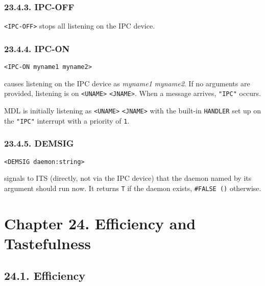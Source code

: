 \documentclass[a4paper,]{article}
\begin{document}
\subsubsection{23.4.3. IPC-OFF}\label{ipc-off}

\texttt{\textless{}IPC-OFF\textgreater{}} stops all listening on the IPC device.

\subsubsection{23.4.4. IPC-ON}\label{ipc-on}

\begin{verbatim}
<IPC-ON myname1 myname2>
\end{verbatim}

 causes listening on the IPC device as \emph{myname1} \emph{myname2}. If no arguments are
provided, listening is on \texttt{\textless{}UNAME\textgreater{}} \texttt{\textless{}JNAME\textgreater{}}. When a message
arrives, \texttt{"IPC"} occurs.

MDL is initially listening as \texttt{\textless{}UNAME\textgreater{}} \texttt{\textless{}JNAME\textgreater{}} with the
built-in \texttt{HANDLER} set up on the \texttt{"IPC"} interrupt with a priority of \texttt{1}.

\subsubsection{23.4.5. DEMSIG}\label{demsig}

\begin{verbatim}
<DEMSIG daemon:string>
\end{verbatim}

 signals to ITS (directly, not via the IPC device) that the daemon named by its argument
should run now. It returns \texttt{T} if the daemon exists, \texttt{\#FALSE\ ()} otherwise.

\section{Chapter 24. Efficiency and Tastefulness}\label{chapter-24.-efficiency-and-tastefulness}

\subsection{24.1. Efficiency}\label{efficiency}
\end{document}

